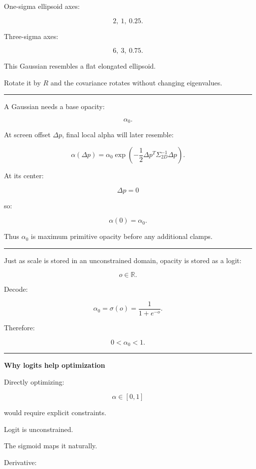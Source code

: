 One-sigma ellipsoid axes:

\[
2,\ 1,\ 0.25.
\]

Three-sigma axes:

\[
6,\ 3,\ 0.75.
\]

This Gaussian resembles a flat elongated ellipsoid.

Rotate it by \(R\) and the covariance rotates without changing eigenvalues.

\begin{center}\rule{0.5\linewidth}{0.5pt}\end{center}

A Gaussian needs a base opacity:

\[
\alpha_0.
\]

At screen offset \(\Delta p\), final local alpha will later resemble:

\[
\alpha(\Delta p)
=
\alpha_0
\exp
\left(
-\frac12
\Delta p^T
\Sigma_{2D}^{-1}
\Delta p
\right).
\]

At its center:

\[
\Delta p=0
\]

so:

\[
\alpha(0)=\alpha_0.
\]

Thus \(\alpha_0\) is maximum primitive opacity before any additional clamps.

\begin{center}\rule{0.5\linewidth}{0.5pt}\end{center}

Just as scale is stored in an unconstrained domain, opacity is stored as a logit:

\[
o\in\mathbb R.
\]

Decode:

\[
\boxed{
\alpha_0
=
\sigma(o)
=
\frac1{1+e^{-o}}.
}
\]

Therefore:

\[
0<\alpha_0<1.
\]

\begin{center}\rule{0.5\linewidth}{0.5pt}\end{center}

\textbf{Why logits help optimization}

Directly optimizing:

\[
\alpha\in[0,1]
\]

would require explicit constraints.

Logit is unconstrained.

The sigmoid maps it naturally.

Derivative:

